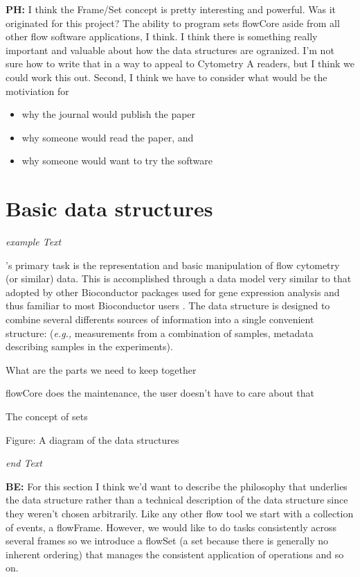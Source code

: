 \documentclass[12pt]{article}
\begin{document}
{\bf PH:} I think the Frame/Set concept is pretty interesting and
powerful. Was it originated for this project? The ability to program
sets flowCore aside from all other flow software applications, I
think. I think there is something really important and valuable about
how the data structures are ogranized. I'm not sure how to write that
in a way to appeal to Cytometry A readers, but I think we could work
this out. Second, I think we have to consider what would be the
motiviation for 
\begin{itemize}
\item why the journal would publish the paper 
\item why someone would read the paper, and
\item why someone would want to try the software
\end{itemize}

\section{Basic data structures}

\textit{example Text}

's primary task is the representation and basic
manipulation of flow cytometry (or similar) data. This is accomplished
through a data model very similar to that adopted by other
Bioconductor packages used for gene expression analysis and thus
familiar to most Bioconductor users \cite{}.  The data structure is
designed to combine several differents sources of information into a
single convenient structure: (\textit{e.g.,} measurements from a
combination of samples, metadata describing samples in the
experiments).

What are the parts we need to keep together

flowCore does the maintenance, the user doesn't have to care about
that

The concept of sets

Figure: A diagram of the data structures 

\textit{end Text}


{\bf BE:} For this section I think we'd want to describe the philosophy that
underlies the data structure rather than a technical description of
the data structure since they weren't chosen arbitrarily. Like any
other flow tool we start with a collection of events, a flowFrame.
However, we would like to do tasks consistently across several frames
so we introduce a flowSet (a set because there is generally no
inherent ordering) that manages the consistent application of
operations and so on.
\end{document}
